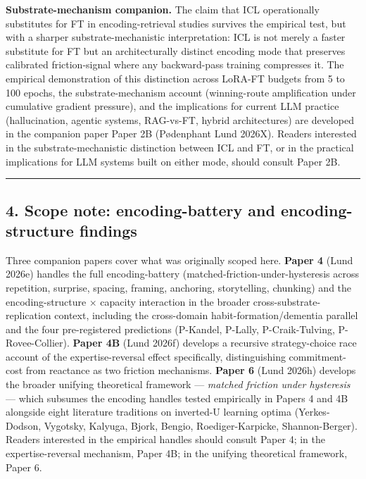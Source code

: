 \documentclass[
]{article}
\begin{document}
\textbf{Substrate-mechanism companion.} The claim that ICL operationally
substitutes for FT in encoding-retrieval studies survives the empirical
test, but with a sharper substrate-mechanistic interpretation: ICL is
not merely a faster substitute for FT but an architecturally distinct
encoding mode that preserves calibrated friction-signal where any
backward-pass training compresses it. The empirical demonstration of
this distinction across LoRA-FT budgets from 5 to 100 epochs, the
substrate-mechanism account (winning-route amplification under
cumulative gradient pressure), and the implications for current LLM
practice (hallucination, agentic systems, RAG-vs-FT, hybrid
architectures) are developed in the companion paper Paper 2B (Pødenphant
Lund 2026X). Readers interested in the substrate-mechanistic distinction
between ICL and FT, or in the practical implications for LLM systems
built on either mode, should consult Paper 2B.

\begin{center}\rule{0.5\linewidth}{0.5pt}\end{center}

\subsection{4. Scope note: encoding-battery and encoding-structure
findings}\label{scope-note-encoding-battery-and-encoding-structure-findings}

Three companion papers cover what was originally scoped here.
\textbf{Paper 4} (Lund 2026e) handles the full encoding-battery
(matched-friction-under-hysteresis across repetition, surprise, spacing,
framing, anchoring, storytelling, chunking) and the encoding-structure ×
capacity interaction in the broader cross-substrate-replication context,
including the cross-domain habit-formation/dementia parallel and the
four pre-registered predictions (P-Kandel, P-Lally, P-Craik-Tulving,
P-Rovee-Collier). \textbf{Paper 4B} (Lund 2026f) develops a recursive
strategy-choice race account of the expertise-reversal effect
specifically, distinguishing commitment-cost from reactance as two
friction mechanisms. \textbf{Paper 6} (Lund 2026h) develops the broader
unifying theoretical framework --- \emph{matched friction under
hysteresis} --- which subsumes the encoding handles tested empirically
in Papers 4 and 4B alongside eight literature traditions on inverted-U
learning optima (Yerkes-Dodson, Vygotsky, Kalyuga, Bjork, Bengio,
Roediger-Karpicke, Shannon-Berger). Readers interested in the empirical
handles should consult Paper 4; in the expertise-reversal mechanism,
Paper 4B; in the unifying theoretical framework, Paper 6.
\end{document}
